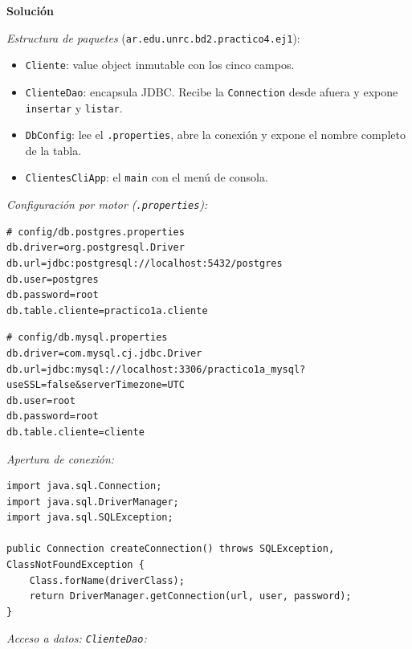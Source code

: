 \documentclass[11pt,a4paper]{article}
\newcommand{\itemcabecera}[1]{\noindent\textbf{#1}\par\medskip}
\newcommand{\bloqueSolucion}{\itemcabecera{Soluci\'on}}
\begin{document}
\bloqueSolucion

\textit{Estructura de paquetes} (\texttt{ar.edu.unrc.bd2.practico4.ej1}):

\begin{itemize}
    \item \texttt{Cliente}: value object inmutable con los cinco campos.
    \item \texttt{ClienteDao}: encapsula JDBC. Recibe la \texttt{Connection} desde afuera y expone \texttt{insertar} y \texttt{listar}.
    \item \texttt{DbConfig}: lee el \texttt{.properties}, abre la conexión y expone el nombre completo de la tabla.
    \item \texttt{ClientesCliApp}: el \texttt{main} con el menú de consola.
\end{itemize}

\textit{Configuración por motor (\texttt{.properties}):}

\begin{lstlisting}[style=propsstyle]
# config/db.postgres.properties
db.driver=org.postgresql.Driver
db.url=jdbc:postgresql://localhost:5432/postgres
db.user=postgres
db.password=root
db.table.cliente=practico1a.cliente
\end{lstlisting}

\begin{lstlisting}[style=propsstyle]
# config/db.mysql.properties
db.driver=com.mysql.cj.jdbc.Driver
db.url=jdbc:mysql://localhost:3306/practico1a_mysql?useSSL=false&serverTimezone=UTC
db.user=root
db.password=root
db.table.cliente=cliente
\end{lstlisting}

\textit{Apertura de conexión:}

\begin{lstlisting}
import java.sql.Connection;
import java.sql.DriverManager;
import java.sql.SQLException;

public Connection createConnection() throws SQLException, ClassNotFoundException {
    Class.forName(driverClass);
    return DriverManager.getConnection(url, user, password);
}
\end{lstlisting}

\textit{Acceso a datos: \texttt{ClienteDao}:}
\end{document}
